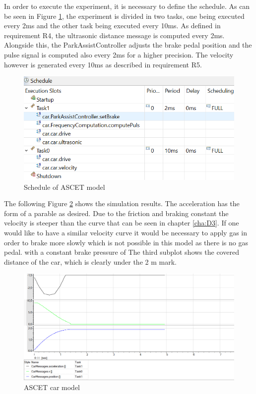 In order to execute the experiment, it is necessary to define the schedule. As can be seen in Figure \ref{fig:D7_schedule}, the experiment is divided in two tasks, one being executed every 2ms and the other task being executed every 10ms. As defined in requirement R4, the ultrasonic distance message is computed every 2ms. Alongside this, the ParkAssistController adjusts the brake pedal position and the pulse signal is computed also every 2ms for a higher precision. The velocity however is generated every 10ms as described in requirement R5.

\begin{figure}[H]
\centering
\includegraphics[width=1\textwidth]{images/pc_app.png}
\caption{Schedule of ASCET model}
\label{fig:D7_schedule}
\end{figure}

The following Figure \ref{fig:D7_result} shows the simulation results. The acceleration has the form of a parable as desired. Due to the friction and braking constant the velocity is steeper than the curve that can be seen in chapter \ref{cha:D3}. If one would like to have a similar velocity curve it would be necessary to apply gas in order to brake more slowly which is not possible in this model as there is no gas pedal. with a constant brake pressure of
The third subplot shows the covered
distance of the car, which is clearly under the 2 m mark. 

\begin{figure}[H]
\centering
\includegraphics[width=1\textwidth]{images/ascet_acceleration.png}
\caption{ASCET car model}
\label{fig:D7_result}
\end{figure}

